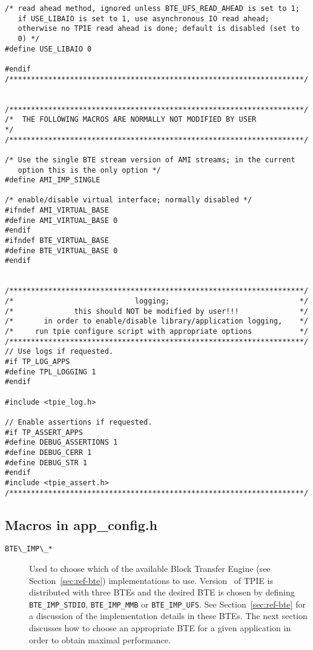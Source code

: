 \begin{verbatim}
/* read ahead method, ignored unless BTE_UFS_READ_AHEAD is set to 1;
   if USE_LIBAIO is set to 1, use asynchronous IO read ahead;
   otherwise no TPIE read ahead is done; default is disabled (set to
   0) */
#define USE_LIBAIO 0

#endif
/********************************************************************/


/********************************************************************/
/*  THE FOLLOWING MACROS ARE NORMALLY NOT MODIFIED BY USER           */
/********************************************************************/

/* Use the single BTE stream version of AMI streams; in the current
   option this is the only option */
#define AMI_IMP_SINGLE

/* enable/disable virtual interface; normally disabled */
#ifndef AMI_VIRTUAL_BASE
#define AMI_VIRTUAL_BASE 0
#endif
#ifndef BTE_VIRTUAL_BASE 
#define BTE_VIRTUAL_BASE 0
#endif


/********************************************************************/
/*                            logging;                              */
/*              this should NOT be modified by user!!!              */
/*       in order to enable/disable library/application logging,    */
/*     run tpie configure script with appropriate options           */
/********************************************************************/
// Use logs if requested.
#if TP_LOG_APPS
#define TPL_LOGGING 1
#endif

#include <tpie_log.h>

// Enable assertions if requested.
#if TP_ASSERT_APPS
#define DEBUG_ASSERTIONS 1
#define DEBUG_CERR 1
#define DEBUG_STR 1
#endif
#include <tpie_assert.h>
/********************************************************************/
\end{verbatim}

\subsection{Macros in app\_config.h}

\begin{description}
\item[{\verb|BTE\_IMP\_*|}] Used to choose which of the available Block
Transfer Engine (see Section~\ref{sec:ref-bte}) implementations to
use. Version \version~of TPIE is distributed with three BTEs and the
desired BTE is chosen by defining \verb|BTE_IMP_STDIO|, \verb|BTE_IMP_MMB|
or \verb|BTE_IMP_UFS|. See Section~\ref{sec:ref-bte} for a discussion of
the implementation details in these BTEs. The next section discusses how to
choose an appropriate BTE for a given application in order to obtain
maximal performance.

\end{description}

